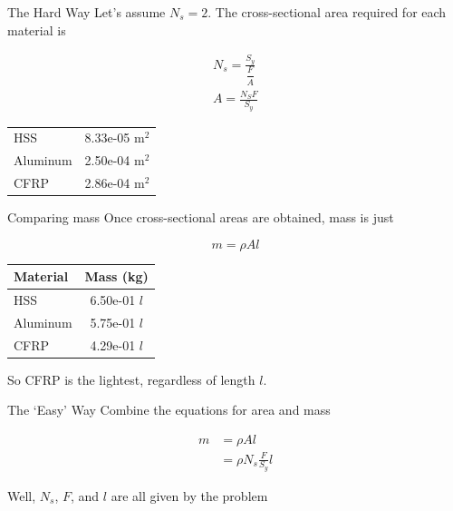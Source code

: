 \documentclass[10pt, svgnames]{beamer}
\begin{document}
\begin{frame}[label={sec:orgfac73f3}]{The Hard Way}
Let's assume \(N_s = 2\). The cross-sectional area required for each material is

\begin{gather*}
  N_s = \frac{S_y}{\dfrac{F}{A}} \\
  A = \frac{N_S F}{S_y}
\end{gather*}

\begin{center}
\begin{tabular}{lc}
\toprule
HSS & 8.33e-05 m$^2$ \\
Aluminum & 2.50e-04 m$^2$ \\
CFRP & 2.86e-04 m$^2$ \\
\bottomrule
\end{tabular}
\end{center}
\end{frame}


\begin{frame}[label={sec:orgfe34afd}]{Comparing mass}
Once cross-sectional areas are obtained, mass is just

\begin{equation*}
  m = \rho A l
\end{equation*}

\begin{center}
\begin{tabular}{lc}
\toprule
Material & Mass (kg) \\
\midrule
HSS & 6.50e-01 $l$ \\
Aluminum & 5.75e-01 $l$ \\
CFRP & 4.29e-01 $l$ \\
\bottomrule
\end{tabular}
\end{center}

So CFRP is the lightest, regardless of length \(l\).
\end{frame}


\begin{frame}[label={sec:orgca43657}]{The `Easy' Way}
Combine the equations for area and mass

\begin{align*}
  m &= \rho A l \\
    &= \rho N_s \frac{F}{S_y} l
\end{align*}

Well, \(N_s\), \(F\), and \(l\) are all given by the problem
\end{frame}
\end{document}
